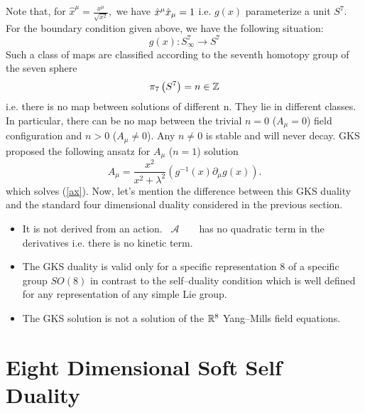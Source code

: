 \documentclass[a4paper,12pt]{book}
\begin{document}
Note that, for $\hat{x}^{\mu }=\frac{x^{\mu }}{\sqrt{x^{2}}},$ we have $\hat{%
x}^{\mu }\hat{x}_{\mu }=1$ i.e. $g\left( x\right) $ parameterize a unit $%
S^{7}.$ For the boundary condition given above, we have the following
situation: 
\begin{equation}
g\left( x\right) :S_{\infty }^{7}\longrightarrow S^{7}
\end{equation}
Such a class of maps are classified according to the seventh homotopy group
of the seven sphere 
\begin{equation}
\pi _{7}\left( S^{7}\right) =n\in \Bbb{Z}
\end{equation}
i.e. there is no map between solutions of different n. They lie in different
classes. In particular, there can be no map between the trivial $n=0$ ($%
A_{\mu }=0$) field configuration and $n>0$ ($A_{\mu }\neq 0$). Any $n\neq 0$
is stable and will never decay. GKS proposed the following ansatz for $%
A_{\mu }$ ($n=1$) solution 
\begin{equation}
A_{\mu }=\frac{x^{2}}{x^{2}+\lambda ^{2}}\left( g^{-1}\left( x\right)
\partial _{\mu }g\left( x\right) \right) .
\end{equation}
which solves (\ref{ax}). Now, let's mention the difference between this GKS
duality and the standard four dimensional duality considered in the previous
section.

\begin{itemize}
\item  It is not derived from an action. \ $\mathcal{A}$\ \ \ \ has no
quadratic term in the derivatives i.e. there is no kinetic term.

\item  The GKS duality is valid only for a specific representation $8$ of a
specific group $SO\left( 8\right) $ in contrast to the self--duality
condition which is well defined for any representation of any simple Lie
group.

\item  The GKS solution is not a solution of the $\Bbb{R}^{8}$ Yang--Mills
field equations.
\end{itemize}

\section{Eight Dimensional Soft Self Duality}
\end{document}
